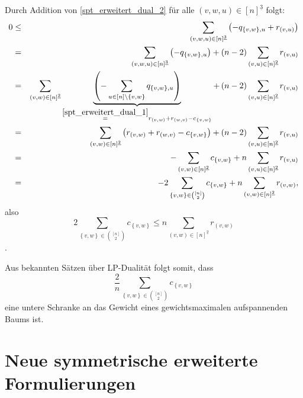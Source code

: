 \documentclass[10p,a4paper,BCOR = 12mm, DIV=15]{scrbook}
\begin{document}
{\begin{bew}
Durch Addition von \eqref{spt_erweitert_dual_2} für alle $\left(v,w,u\right)\in \left[n\right]^{\underline{3}}$ folgt:
\begin{eqnarray*}
0 & \leq & \sum_{\left(v,w,u\right)\in \left[n\right]^{\underline{3}}}\left(-q_{\left\{v, w\right\}, u} + r_{\left(v, u\right)}\right) \\
& = & \sum_{\left(v,w,u\right)\in \left[n\right]^{\underline{3}}} \left(-q_{\left\{v, w\right\}, u}\right) +\left(n-2\right) \sum_{\left(v,u\right)\in \left[n\right]^{\underline{2}}} r_{\left(v, u\right)} \\
& = & \sum_{\left(v,w\right)\in \left[n\right]^{\underline{2}}} \underbrace{\left(-\sum_{u\in\left[n\right]\backslash\left\{v, w\right\}} q_{\left\{v, w\right\}, u}\right)}_{\stackrel{\eqref{spt_erweitert_dual_1}}{=} r_{\left(v, w\right)}+r_{\left(w, v\right)}-c_{\left\{v, w\right\}}} +\left(n-2\right) \sum_{\left(v,u\right)\in \left[n\right]^{\underline{2}}} r_{\left(v, u\right)} \\
& = & \sum_{\left(v,w\right)\in \left[n\right]^{\underline{2}}} \left(r_{\left(v, w\right)}+r_{\left(w, v\right)}-c_{\left\{v, w\right\}}\right) + \left(n-2\right) \sum_{\left(v,u\right)\in \left[n\right]^{\underline{2}}} r_{\left(v, u\right)} \\
& = & -\sum_{\left(v,w\right)\in \left[n\right]^{\underline{2}}} c_{\left\{v, w\right\}} +n \sum_{\left(v,u\right)\in \left[n\right]^{\underline{2}}} r_{\left(v, u\right)} \\
& = & - 2 \sum_{\left\{v,w\right\}\in {\left[n\right] \choose 2}} c_{\left\{v, w\right\}} + n \sum_{\left(v,w\right)\in \left[n\right]^{\underline{2}}} r_{\left(v, w\right)},
\end{eqnarray*}
also
\begin{displaymath}
2 \sum_{\left\{v,w\right\}\in {\left[n\right] \choose 2}} c_{\left\{v, w\right\}} \leq n \sum_{\left(v,w\right)\in \left[n\right]^{\underline{2}}} r_{\left(v, w\right)}
\end{displaymath}.

Aus bekannten Sätzen über LP-Dualität folgt somit, dass
\begin{displaymath}
\frac{2}{n} \sum_{\left\{v,w\right\}\in {\left[n\right] \choose 2}} c_{\left\{v, w\right\}}
\end{displaymath}
eine untere Schranke an das Gewicht eines gewichtsmaximalen aufspannenden Baums ist. 
\end{bew}

\chapter{Neue symmetrische erweiterte Formulierungen}

}
\end{document}
